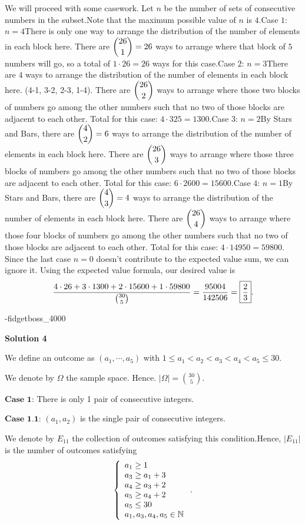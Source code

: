 \begin{enumerate}
We will proceed with some casework. Let $n$ be the number of sets of consecutive numbers in the subset.Note that the maximum possible value of $n$ is $4.$Case $1$: $n = 4$There is only one way to arrange the distribution of the number of elements in each block here. There are $\dbinom{26}{1} = 26$ ways to arrange where that block of $5$ numbers will go, so a total of $1 \cdot 26 = 26$ ways for this case.Case $2$: $n = 3$There are $4$ ways to arrange the distribution of the number of elements in each block here. (4-1, 3-2, 2-3, 1-4). There are $\dbinom{26}{2}$ ways to arrange where those two blocks of numbers go among the other numbers such that no two of those blocks are adjacent to each other. Total for this case: $4 \cdot 325 = 1300.$Case $3$: $n = 2$By Stars and Bars, there are $\dbinom{4}{2} = 6$ ways to arrange the distribution of the number of elements in each block here. There are $\dbinom{26}{3}$ ways to arrange where those three blocks of numbers go among the other numbers such that no two of those blocks are adjacent to each other. Total for this case: $6 \cdot 2600 = 15600.$Case $4$: $n = 1$By Stars and Bars, there are $\dbinom{4}{3} = 4$ ways to arrange the distribution of the number of elements in each block here. There are $\dbinom{26}{4}$ ways to arrange where those four blocks of numbers go among the other numbers such that no two of those blocks are adjacent to each other. Total for this case: $4 \cdot 14950 = 59800.$Since the last case $n=0$ doesn't contribute to the expected value sum, we can ignore it. Using the expected value formula, our desired value is 
 \[\frac{4 \cdot 26 + 3 \cdot 1300 + 2 \cdot 15600 + 1 \cdot 59800}{\tbinom{30}{5}} = \frac{95004}{142506} = \boxed{\frac{2}{3}}.\]

 -fidgetboss\_4000

 



\textbf{Solution 4}

We define an outcome as $\left( a_1 ,\cdots, a_5 \right)$ with $1 \leq a_1 < a_2 < a_3 < a_4 < a_5 \leq 30$.

 We denote by $\Omega$ the sample space. Hence. $| \Omega | = \binom{30}{5}$.

 $\textbf{Case 1}$: There is only 1 pair of consecutive integers.

 $\textbf{Case 1.1}$: $\left( a_1 , a_2 \right)$ is the single pair of consecutive integers.

 We denote by $E_{11}$ the collection of outcomes satisfying this condition.Hence, $| E_{11} |$ is the number of outcomes satisfying
 \[ \left\{ \begin{array}{l} a_1 \geq 1 \\ a_3 \geq a_1 + 3 \\ a_4 \geq a_3 + 2 \\ a_5 \geq a_4 + 2 \\ a_5 \leq 30 \\ a_1, a_3, a_4, a_5 \in \Bbb N \end{array} \right.. \]


\end{enumerate}
